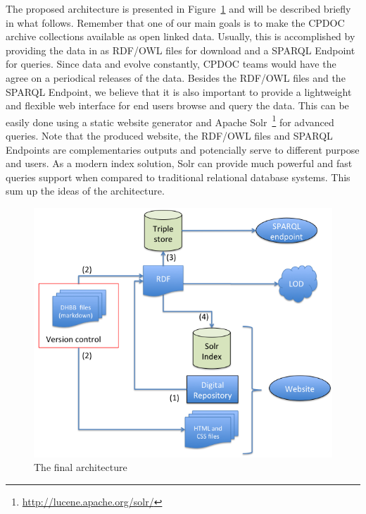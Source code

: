 

The proposed architecture is presented in Figure~\ref{fig:dia-2} and
will be described briefly in what follows. Remember that one of our
main goals is to make the CPDOC archive collections available as open
linked data. Usually, this is accomplished by providing the data in as
RDF/OWL files for download and a SPARQL Endpoint~\cite{sparql} for
queries. Since data and evolve constantly, CPDOC teams would have the
agree on a periodical releases of the data. Besides the RDF/OWL files
and the SPARQL Endpoint, we believe that it is also important to
provide a lightweight and flexible web interface for end users browse
and query the data. This can be easily done using a static website
generator and Apache
Solr~\footnote{\url{http://lucene.apache.org/solr/}} for advanced
queries. Note that the produced website, the RDF/OWL files and SPARQL
Endpoints are complementaries outputs and potencially serve to
different purpose and users. As a modern index solution, Solr can
provide much powerful and fast queries support when compared to
traditional relational database systems. This sum up the ideas of the
architecture.

\begin{figure}[htbp]
  \centering
  \includegraphics[width=.6\textwidth]{new-architecture.png}
  \caption{The final architecture}\label{fig:dia-2}
\end{figure}


